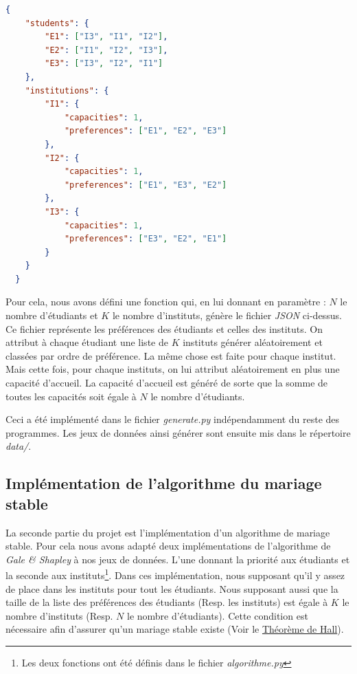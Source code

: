\documentclass[12pt,titlepage]{article}
\begin{document}
\newpage

\begin{lstlisting}[language=json, caption="Exemple d'un fichier de préférences"]
  {
    "students": {
        "E1": ["I3", "I1", "I2"],
        "E2": ["I1", "I2", "I3"],
        "E3": ["I3", "I2", "I1"]
    },
    "institutions": {
        "I1": {
            "capacities": 1,
            "preferences": ["E1", "E2", "E3"]
        },
        "I2": {
            "capacities": 1,
            "preferences": ["E1", "E3", "E2"]
        },
        "I3": {
            "capacities": 1,
            "preferences": ["E3", "E2", "E1"]
        }
    }
  }
\end{lstlisting}

Pour cela, nous avons défini une fonction qui, en lui donnant en paramètre : $N$ le nombre d'étudiants et $K$ le nombre d'instituts, génère le fichier \textit{JSON} ci-dessus. Ce fichier représente les préférences des étudiants et celles des instituts. On attribut à chaque étudiant une liste de $K$ instituts générer aléatoirement et classées par ordre de préférence. La même chose est faite pour chaque institut. Mais cette fois, pour chaque instituts, on lui attribut aléatoirement en plus une capacité d'accueil. La capacité d'accueil est généré de sorte que la somme de toutes les capacités soit égale à $N$ le nombre d'étudiants.

Ceci a été implémenté dans le fichier \textit{generate.py} indépendamment du reste des programmes. Les jeux de données ainsi générer sont ensuite mis dans le répertoire \textit{data/}.

\subsection{Implémentation de l'algorithme du mariage stable}

La seconde partie du projet est l'implémentation d'un algorithme de mariage stable. Pour cela nous avons adapté deux implémentations de l'algorithme de \textit{Gale \& Shapley} à nos jeux de données. L'une donnant la priorité aux étudiants et la seconde aux instituts\footnote{Les deux fonctions ont été définis dans le fichier \textit{algorithme.py}}. Dans ces implémentation, nous supposant qu'il y assez de place dans les instituts pour tout les étudiants. Nous supposant aussi que la taille de la liste des préférences des étudiants (Resp. les instituts) est égale à $K$ le nombre d'instituts (Resp. $N$ le nombre d'étudiants). Cette condition est nécessaire afin d'assurer qu'un mariage stable existe (Voir le \href{https://fr.wikipedia.org/wiki/Th%C3%A9or%C3%A8me_de_Hall}{Théorème de Hall}).
\end{document}
